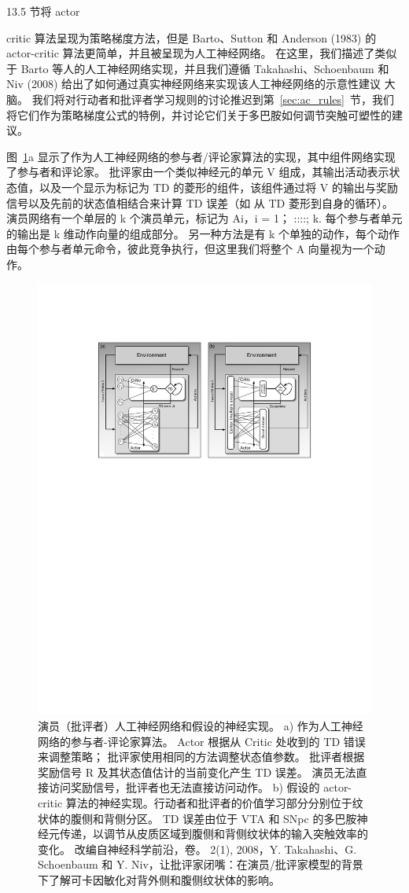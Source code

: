 13.5 节将 actor{critic 算法呈现为策略梯度方法，但是 Barto、Sutton 和 Anderson (1983) 的 actor-critic 算法更简单，并且被呈现为人工神经网络。
在这里，我们描述了类似于 Barto 等人的人工神经网络实现，并且我们遵循 Takahashi、Schoenbaum 和 Niv (2008) 给出了如何通过真实神经网络来实现该人工神经网络的示意性建议 大脑。
我们将对行动者和批评者学习规则的讨论推迟到第~\ref{sec:ac_rules}~节，我们将它们作为策略梯度公式的特例，并讨论它们关于多巴胺如何调节突触可塑性的建议。


图~\ref{fig:12_6}a 显示了作为人工神经网络的参与者/评论家算法的实现，其中组件网络实现了参与者和评论家。
批评家由一个类似神经元的单元 V 组成，其输出活动表示状态值，以及一个显示为标记为 TD 的菱形的组件，该组件通过将 V 的输出与奖励信号以及先前的状态值相结合来计算 TD 误差（如 从 TD 菱形到自身的循环）。
演员网络有一个单层的 k 个演员单元，标记为 Ai，i = 1； ::::; k. 每个参与者单元的输出是 k 维动作向量的组成部分。 
另一种方法是有 k 个单独的动作，每个动作由每个参与者单元命令，彼此竞争执行，但这里我们将整个 A 向量视为一个动作。


\begin{figure}[!htb]
	\centering
	\includegraphics[width=0.5\linewidth]{chap12/fig_12_6}
	\caption{演员（批评者）人工神经网络和假设的神经实现。 a) 作为人工神经网络的参与者-评论家算法。
			Actor 根据从 Critic 处收到的 TD 错误来调整策略；
			批评家使用相同的方法调整状态值参数。
			批评者根据奖励信号 R 及其状态值估计的当前变化产生 TD 误差。
			演员无法直接访问奖励信号，批评者也无法直接访问动作。
			b) 假设的 actor-critic 算法的神经实现。行动者和批评者的价值学习部分分别位于纹状体的腹侧和背侧分区。
			TD 误差由位于 VTA 和 SNpc 的多巴胺神经元传递，以调节从皮质区域到腹侧和背侧纹状体的输入突触效率的变化。 改编自神经科学前沿，卷。 2(1), 2008，Y. Takahashi、G. Schoenbaum 和 Y. Niv，让批评家闭嘴：在演员/批评家模型的背景下了解可卡因敏化对背外侧和腹侧纹状体的影响。
		\label{fig:12_6}}
\end{figure}


}
